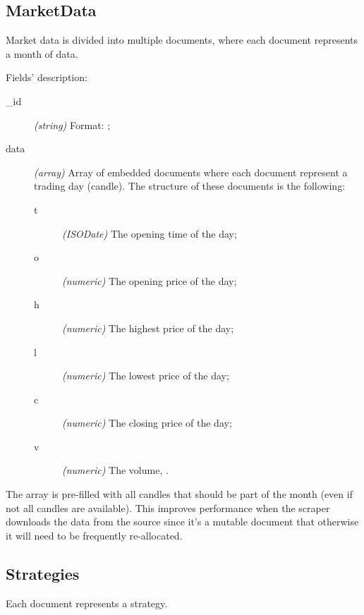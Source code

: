 \subsection{MarketData}

Market data is divided into multiple documents, where each document represents a
month of data.



Fields' description:
\begin{description}
	\item[\_id] \textit{(string)} Format:
		;
	\item[data] \textit{(array)} Array of embedded documents where each
		document represent a trading day (candle). The structure of
		these documents is the following:
		\begin{description}
			\item[t] \textit{(ISODate)} The opening time of the
				day;
			\item[o] \textit{(numeric)} The opening price of the
				day;
			\item[h] \textit{(numeric)} The highest price of the
				day;
			\item[l] \textit{(numeric)} The lowest price of the day;
			\item[c] \textit{(numeric)} The closing price of the
				day;
			\item[v] \textit{(numeric)} The volume, .
		\end{description}
\end{description}

The  array is pre-filled with all candles that should be part of the
month (even if not all candles are available). This improves performance when
the scraper downloads the data from the source since it's a mutable document
that otherwise it will need to be frequently re-allocated.

\subsection{Strategies}

Each document represents a strategy.



